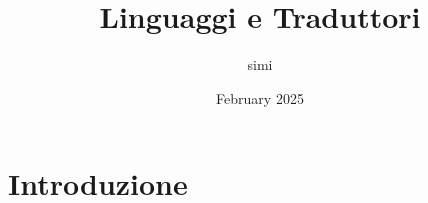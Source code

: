 \documentclass[a4paper,12pt]{report}
\title{Linguaggi e Traduttori}
\author{simi }
\date{February 2025}
\begin{document}
\maketitle

\chapter{Introduzione}

\end{document}
